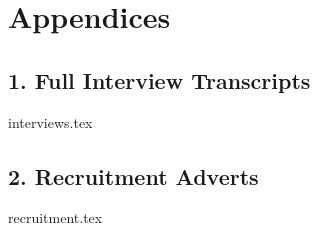 \cleardoublepage

\section*{Appendices}

\subsection*{1. Full Interview Transcripts} \label{app:transcripts}
{interviews.tex}

\newpage

\subsection*{2. Recruitment Adverts} \label{app:recruitment}
{recruitment.tex}

\newpage
